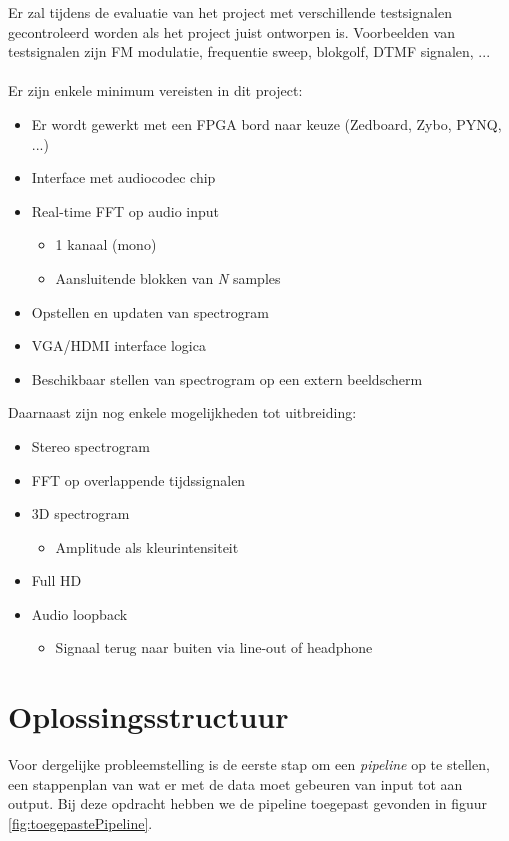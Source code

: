\documentclass[a4paper,kul]{kulakarticle} %
\begin{document}
Er zal tijdens de evaluatie van het project met verschillende testsignalen gecontroleerd worden als het project juist ontworpen is. Voorbeelden van testsignalen zijn FM modulatie, frequentie sweep, blokgolf, DTMF signalen, ... \\
\\ Er zijn enkele minimum vereisten in dit project:
\begin{itemize}
	\item Er wordt gewerkt met een FPGA bord naar keuze (Zedboard, Zybo, PYNQ, ...)
	\item Interface met audiocodec chip
	\item Real-time FFT op audio input
	\begin{itemize}
		\item 1 kanaal (mono)
		\item Aansluitende blokken van \textit{N} samples
	\end{itemize}
	\item Opstellen en updaten van spectrogram
	\item VGA/HDMI interface logica
	\item Beschikbaar stellen van spectrogram op een extern beeldscherm
\end{itemize}
Daarnaast zijn nog enkele mogelijkheden tot uitbreiding:
\begin{itemize}
	\item Stereo spectrogram
	\item FFT op overlappende tijdssignalen
	\item 3D spectrogram
	\begin{itemize}
		\item Amplitude als kleurintensiteit
	\end{itemize}
	\item Full HD
	\item Audio loopback
	\begin{itemize}
		\item Signaal terug naar buiten via line-out of headphone
	\end{itemize}
\end{itemize}

\section{Oplossingsstructuur}
Voor dergelijke probleemstelling is de eerste stap om een \textit{pipeline} op te stellen, een stappenplan van wat er met de data moet gebeuren van input tot aan output. Bij deze opdracht hebben we de pipeline toegepast gevonden in figuur \ref{fig:toegepastePipeline}.
\end{document}
